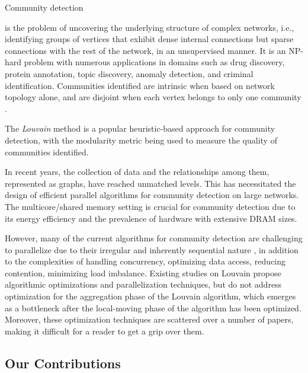 Community detection is the problem of uncovering the underlying structure of complex networks, i.e., identifying groups of vertices that exhibit dense internal connections but sparse connections with the rest of the network, in an unsupervised manner. It is an NP-hard problem with numerous applications in domains such as drug discovery, protein annotation, topic discovery, anomaly detection, and criminal identification. Communities identified are intrinsic when based on network topology alone, and are disjoint when each vertex belongs to only one community \cite{com-gregory10}. The \textit{Louvain} method \cite{com-blondel08} is a popular heuristic-based approach for community detection, with the modularity metric \cite{com-newman06} being used to measure the quality of communities identified.

In recent years, the collection of data and the relationships among them, represented as graphs, have reached unmatched levels. This has necessitated the design of efficient parallel algorithms for community detection on large networks. The multicore/shared memory setting is crucial for community detection due to its energy efficiency and the prevalence of hardware with extensive DRAM sizes. However, many of the current algorithms for community detection are challenging to parallelize due to their irregular and inherently sequential nature \cite{com-halappanavar17}, in addition to the complexities of handling concurrency, optimizing data access, reducing contention, minimizing load imbalance. Existing studies on Louvain propose algorithmic optimizations and parallelization techniques, but do not address optimization for the aggregation phase of the Louvain algorithm, which emerges as a bottleneck after the local-moving phase of the algorithm has been optimized. Moreover, these optimization techniques are scattered over a number of papers, making it difficult for a reader to get a grip over them.




\subsection{Our Contributions}

